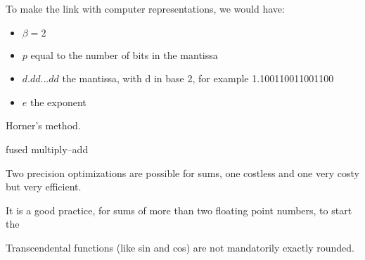 To make the link with computer representations, we would have:
\begin{itemize}
\item $\beta=2$
\item $p$ equal to the number of bits in the mantissa
\item $d.dd...dd$ the mantissa, with d in base 2, for example 1.100110011001100
\item $e$ the exponent
\end{itemize}



Horner's method.

fused multiply–add


Two precision optimizations are possible for sums, one costless and one very costy but very efficient.


It is a good practice, for sums of more than two floating point numbers, to start the 



Transcendental functions (like sin and cos) are not mandatorily exactly rounded.






